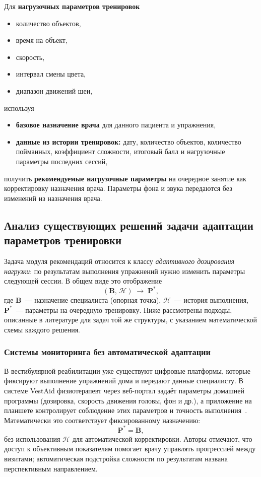 Для \textbf{нагрузочных параметров тренировок}
\begin{itemize}
    \item количество объектов,
    \item время на объект,
    \item скорость,
    \item интервал смены цвета,
    \item диапазон движений шеи,
\end{itemize}
используя
\begin{itemize}
    \item \textbf{базовое назначение врача} для данного пациента
    и упражнения,
    \item \textbf{данные из истории тренировок:} дату, количество
    объектов, количество пойманных, коэффициент сложности, итоговый
    балл и нагрузочные параметры последних сессий,
\end{itemize}
получить \textbf{рекомендуемые нагрузочные параметры} на очередное
занятие как корректировку назначения врача. Параметры фона и звука передаются
без изменений из назначения врача.

\subsection{Анализ существующих решений задачи адаптации параметров тренировки}

Задача модуля рекомендаций относится к классу \emph{адаптивного дозирования
нагрузки}: по результатам выполнения упражнений нужно изменить параметры
следующей сессии. В общем виде это отображение
\[
(\mathbf{B},\, \mathcal{H}) \;\longrightarrow\; \mathbf{P}^{*},
\]
где $\mathbf{B}$~--- назначение специалиста (опорная точка),
$\mathcal{H}$~--- история выполнения, $\mathbf{P}^{*}$~--- параметры
на очередную тренировку. Ниже рассмотрены подходы, описанные в литературе
для задач той же структуры, с указанием математической схемы каждого
решения.

\subsubsection{Системы мониторинга без автоматической адаптации}

В вестибулярной реабилитации уже существуют цифровые платформы, которые
фиксируют выполнение упражнений дома и передают данные специалисту.
В системе VestAid физиотерапевт через веб-портал задаёт параметры
домашней программы (дозировка, скорость движения головы, фон и др.),
а приложение на планшете контролирует соблюдение этих параметров и
точность выполнения~\cite{hovareshti2021}. Математически это соответствует
фиксированному назначению:
\[
\mathbf{P}^{*} = \mathbf{B},
\]
без использования $\mathcal{H}$ для автоматической корректировки.
Авторы отмечают, что доступ к объективным показателям помогает врачу
управлять прогрессией между визитами; автоматическая подстройка сложности
по результатам названа перспективным направлением.

